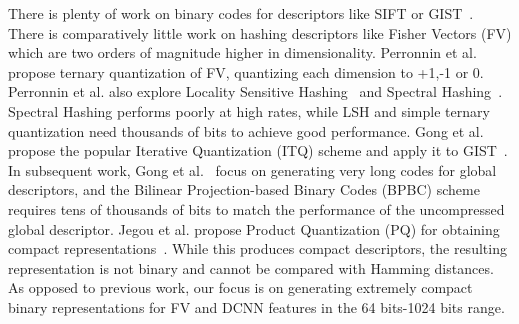 \documentclass[10pt,twocolumn,letterpaper]{article}
\begin{document}
There is plenty of work on binary codes for descriptors like SIFT or GIST~\cite{ITQ,SemiSupervisedHashing,SphericalHashing,KristenHashingSurvey,SpectralHashing,KLSH,SKH,MLH,SmallCodes,SIFTSurvey,CHoG}.
There is comparatively little work on hashing descriptors like Fisher Vectors (FV) which are two orders of magnitude higher in dimensionality.
Perronnin et al.~\cite{Perronnin_CVPR_10} propose ternary quantization of FV, quantizing each dimension to +1,-1 or 0. 
Perronnin et al. also explore Locality Sensitive Hashing~\cite{RandomProjections} and Spectral Hashing~\cite{SpectralHashing}.
Spectral Hashing performs poorly at high rates, while LSH and simple ternary quantization need thousands of bits to achieve good performance.
Gong et al.  propose the popular Iterative Quantization (ITQ) scheme and apply it to GIST~\cite{ITQ}.
In subsequent work, Gong et al.~\cite{BPBC} focus on generating very long codes for global descriptors, and the Bilinear Projection-based Binary Codes (BPBC) scheme requires tens of thousands of bits to match the performance of the uncompressed global descriptor.
Jegou et al. propose Product Quantization (PQ) for obtaining compact representations~\cite{PQFisher}. 
While this produces compact descriptors, the resulting representation is not binary and cannot be compared with Hamming distances.
As opposed to previous work, our focus is on generating extremely compact binary representations for FV and DCNN features in the 64 bits-1024 bits range.
\end{document}
